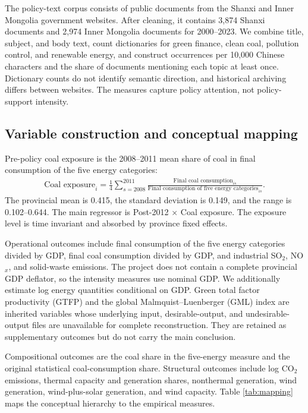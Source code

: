 \documentclass[11pt]{article}
\begin{document}
The policy-text corpus consists of public documents from the Shanxi and Inner Mongolia government websites. After cleaning, it contains 3,874 Shanxi documents and 2,974 Inner Mongolia documents for 2000--2023. We combine title, subject, and body text, count dictionaries for green finance, clean coal, pollution control, and renewable energy, and construct occurrences per 10,000 Chinese characters and the share of documents mentioning each topic at least once. Dictionary counts do not identify semantic direction, and historical archiving differs between websites. The measures capture policy attention, not policy-support intensity.

\subsection{Variable construction and conceptual mapping}

Pre-policy coal exposure is the 2008--2011 mean share of coal in final consumption of the five energy categories:
\begin{equation}
\begin{aligned}
\text{Coal exposure}_{i}
=\frac{1}{4}\sum_{s=2008}^{2011}
\frac{\text{Final coal consumption}_{is}}
{\text{Final consumption of five energy categories}_{is}}.
\end{aligned}
\end{equation}
The provincial mean is 0.415, the standard deviation is 0.149, and the range is 0.102--0.644. The main regressor is Post-2012 $\times$ Coal exposure. The exposure level is time invariant and absorbed by province fixed effects.

Operational outcomes include final consumption of the five energy categories divided by GDP, final coal consumption divided by GDP, and industrial SO$_2$, NO$_x$, and solid-waste emissions. The project does not contain a complete provincial GDP deflator, so the intensity measures use nominal GDP. We additionally estimate log energy quantities conditional on GDP. Green total factor productivity (GTFP) and the global Malmquist--Luenberger (GML) index are inherited variables whose underlying input, desirable-output, and undesirable-output files are unavailable for complete reconstruction. They are retained as supplementary outcomes but do not carry the main conclusion.

Compositional outcomes are the coal share in the five-energy measure and the original statistical coal-consumption share. Structural outcomes include log CO$_2$ emissions, thermal capacity and generation shares, nonthermal generation, wind generation, wind-plus-solar generation, and wind capacity. Table \ref{tab:mapping} maps the conceptual hierarchy to the empirical measures.
\end{document}
